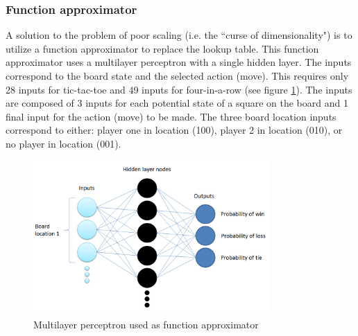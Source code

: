 \documentclass[12pt,a4paper]{article}
\begin{document}
\subsubsection*{Function approximator}
A solution to the problem of poor scaling (i.e. the ``curse of dimensionality") is to utilize a function approximator to replace the lookup table. This function approximator uses a multilayer perceptron with a single hidden layer. The inputs correspond to the board state and the selected action (move). This requires only 28 inputs for tic-tac-toe and 49 inputs for four-in-a-row (see figure \ref{fig:funcApproxFigure}). The inputs are composed of 3 inputs for each potential state of a square on the board and 1 final input for the action (move) to be made. The three board location inputs correspond to either: player one in location (100), player 2 in location (010), or no player in location (001).
\begin{figure}[h]
\centering
\includegraphics[width=0.8\textwidth]{Figures/functionApproxFigure.png}
\caption{Multilayer perceptron used as function approximator}
\label{fig:funcApproxFigure}
\end{figure}
\end{document}
